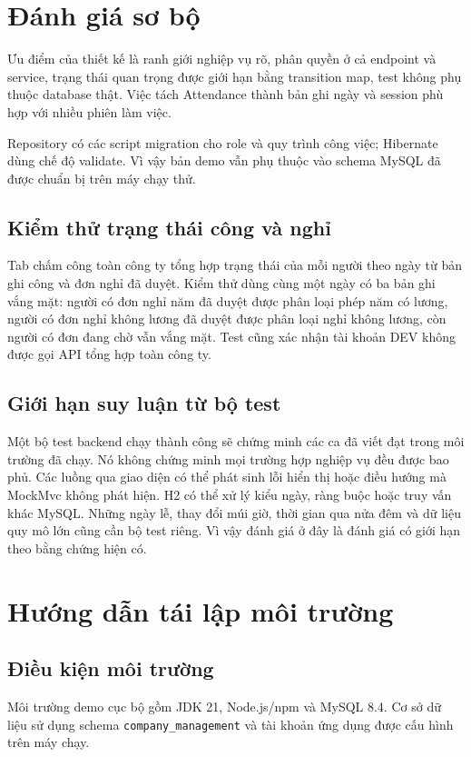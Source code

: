 \documentclass[12pt,a4paper,oneside]{report}
\newcommand{\code}[1]{\texttt{#1}}
\begin{document}
\section{Đánh giá sơ bộ}
Ưu điểm của thiết kế là ranh giới nghiệp vụ rõ, phân quyền ở cả endpoint và service, trạng thái quan trọng được giới hạn bằng transition map, test không phụ thuộc database thật. Việc tách Attendance thành bản ghi ngày và session phù hợp với nhiều phiên làm việc.

Repository có các script migration cho role và quy trình công việc; Hibernate dùng chế độ validate. Vì vậy bản demo vẫn phụ thuộc vào schema MySQL đã được chuẩn bị trên máy chạy thử.

\subsection{Kiểm thử trạng thái công và nghỉ}
Tab chấm công toàn công ty tổng hợp trạng thái của mỗi người theo ngày từ bản ghi công và đơn nghỉ đã duyệt. Kiểm thử dùng cùng một ngày có ba bản ghi vắng mặt: người có đơn nghỉ năm đã duyệt được phân loại phép năm có lương, người có đơn nghỉ không lương đã duyệt được phân loại nghỉ không lương, còn người có đơn đang chờ vẫn vắng mặt. Test cũng xác nhận tài khoản DEV không được gọi API tổng hợp toàn công ty.

\subsection{Giới hạn suy luận từ bộ test}
Một bộ test backend chạy thành công sẽ chứng minh các ca đã viết đạt trong môi trường đã chạy. Nó không chứng minh mọi trường hợp nghiệp vụ đều được bao phủ. Các luồng qua giao diện có thể phát sinh lỗi hiển thị hoặc điều hướng mà MockMvc không phát hiện. H2 có thể xử lý kiểu ngày, ràng buộc hoặc truy vấn khác MySQL. Những ngày lễ, thay đổi múi giờ, thời gian qua nửa đêm và dữ liệu quy mô lớn cũng cần bộ test riêng. Vì vậy đánh giá ở đây là đánh giá có giới hạn theo bằng chứng hiện có.

\section{Hướng dẫn tái lập môi trường}
\subsection{Điều kiện môi trường}
Môi trường demo cục bộ gồm JDK 21, Node.js/npm và MySQL 8.4. Cơ sở dữ liệu sử dụng schema \code{company\_management} và tài khoản ứng dụng được cấu hình trên máy chạy.
\end{document}
